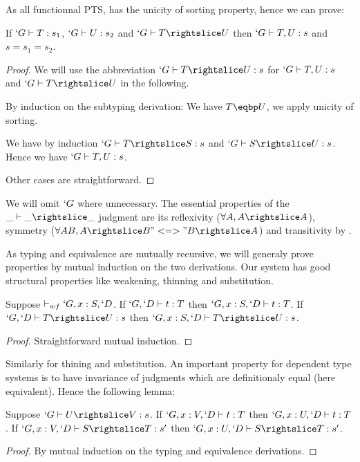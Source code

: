 \documentclass[twocolumn]{article}
\begin{document}
As all functionnal PTS, \Russell{} has the unicity of sorting property,
hence we can prove:
\begin{lemma}
  If $`G \vdash T : s_1$, $`G \vdash U : s_2$ and $`G \typed T \sub U$
  then $`G \vdash T, U : s$ and $s = s_1 = s_2$.
\end{lemma}
\begin{proof}
  We will use the abbreviation $`G \typed T \sub U : s$ for $`G \vdash T,
  U : s$ and $`G \typed T \sub U$ in the following.

  By induction on the subtyping derivation:
   We have $T \eqbp U$, we apply unicity of sorting.

   We have by induction $`G \typed T \sub S : s$ and 
  $`G \typed S \sub U : s$. Hence we have $`G \vdash T, U : s$.

  \caseother{} Other cases are straightforward.
\end{proof}

We will omit $`G$ where unnecessary.
The essential properties of the $\_ \typed \_ \subd \_$ judgment are 
its reflexivity ($\forall A, A \subd A$), symmetry ($\forall A B, A \subd
B "<=>" B \subd A$) and transitivity by .

As typing and equivalence are mutually recursive, we will generaly prove
properties by mutual induction on the two derivations.
Our system has good structural properties like weakening, thinning and
substitution. 

\begin{lemma}[Weakening]
  Suppose $\vdash_{wf} `G, x : S, `D$.
  If $`G, `D \vdash t : T$ then $`G, x : S, `D \vdash t : T$. 
  If $`G, `D \typed T \sub U : s$ then $`G, x : S, `D \typed T \sub U : s$.
\end{lemma}
\begin{proof}
  Straightforward mutual induction.
\end{proof}

Similarly for thining and substitution. An important property for
dependent type systems is to have invariance of judgments which are
definitionaly equal (here equivalent). Hence the following lemma:
\begin{lemma}
  Suppose $`G \typed U \sub V : s$.
  If $`G, x : V, `D \vdash t : T$ then $`G, x : U, `D \vdash t : T$.
  If $`G, x : V, `D \typed S \sub T : s'$ then
  $`G, x : U, `D \typed S \sub T : s'$.
\end{lemma}
\begin{proof}
  By mutual induction on the typing and equivalence derivations.
\end{proof}
\end{document}
